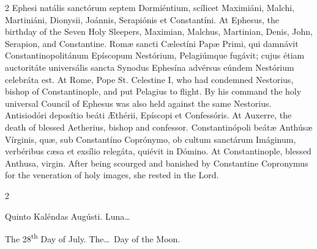 \begin{paracol}{2}
Ephesi natális 
 sanctórum septem Dormiéntium, scílicet Maximiáni, Malchi, Martiniáni, 
 Dionysii, Joánnis, Serapiónis et Constantíni.
\switchcolumn
{}
At Ephesus, the birthday of the 
 Seven Holy Sleepers, Maximian, Malchus, Martinian, Denis, John, Serapion, 
 and Constantine.
\switchcolumn*
{}
Romæ sancti Cælestíni 
 Papæ Primi, qui damnávit Constantinopolitánum Epíscopum Nestórium, 
 Pelagiúmque fugávit; cujus étiam auctoritáte universális sancta Synodus 
 Ephesína advérsus eúndem Nestórium celebráta est.
\switchcolumn
{}
At Rome, Pope St. Celestine I, who 
 had condemned Nestorius, bishop of Constantinople, and put Pelagius to 
 flight. By his command the holy universal Council of Ephesus was also 
 held against the same Nestorius.
\switchcolumn*
{}
Antisiodóri deposítio 
 beáti Æthérii, Epíscopi et Confessóris.
\switchcolumn
{}
At Auxerre, the death of blessed 
 Aetherius, bishop and confessor.
\switchcolumn*
{}
Constantinópoli beátæ 
 Anthúsæ Vírginis, quæ, sub Constantíno Coprónymo, ob cultum sanctárum 
 Imáginum, verbéribus cæsa et exsílio relegáta, quiévit in Dómino.
\switchcolumn
{}
At Constantinople, blessed Anthusa, 
 virgin. After being scourged and banished by Constantine Copronymus 
 for the veneration of holy images, she rested in the Lord.
\switchcolumn*
{}
\end{paracol}


\begin{paracol}{2}
\begin{center}{\color{gregoriocolor} Quinto Kaléndas Augústi. 
 Luna\dots\ }\end{center}
\switchcolumn
{}
\begin{center}{\color{gregoriocolor} The 
 28\textsuperscript{th} Day of 
 July. The\dots\ Day of the Moon.}\end{center}
\end{paracol}

